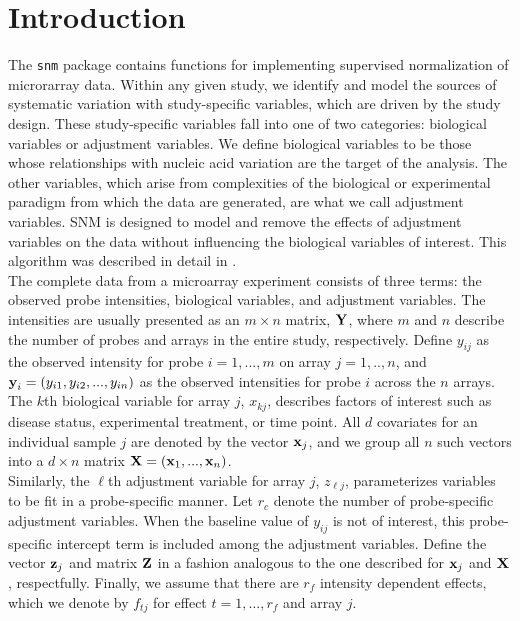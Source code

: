 \documentclass[11pt]{article}
\newcommand{\Rpackage}[1]{{\texttt{#1}}}
\newcommand{ \bm }[1]{ \mbox{\bf {#1}} }
\begin{document}
\section{Introduction}\label{intro}
The \Rpackage{snm} package contains functions for implementing
supervised normalization of microrarray data.  Within any given study,
we identify and model the sources of systematic variation with study-specific
variables, which are driven by the study design. These study-specific variables fall into one of two
categories: biological variables or adjustment variables. We define
biological variables to be those whose relationships with nucleic acid
variation are the target of the analysis. The other variables, which
arise from complexities of the biological or experimental paradigm
from which the data are generated, are what we call adjustment variables.  SNM is
designed to model and remove the effects of adjustment variables on the data
without influencing the biological variables of interest.  This
algorithm was described in detail in \cite{mecham2010}. \\

The complete data from a microarray experiment consists of three terms: the observed
probe intensities, biological variables, and adjustment variables. The intensities 
are usually presented as an $m \times n$ matrix, $\bm{Y}$, where $m$ and $n$ describe the 
number of probes and arrays in the entire study, respectively. Define $y_{ij}$ as the 
observed intensity for probe $i=1,...,m$ on array $j=1,..,n$, and $\bm{y}_i = (y_{i1}, y_{i2}, ..., y_{in})$ 
as the observed intensities for probe $i$ across the $n$ arrays. The $k$th biological variable for 
array $j$, $x_{kj}$, describes factors of interest such as disease status, experimental treatment, 
or time point. All $d$ covariates for an individual sample $j$ are denoted by the vector $\bm{x}_j$, 
and we group all $n$ such vectors into a $d \times n$ matrix $\bm{X} = (\bm{x}_1, ..., \bm{x}_n)$.  \\

Similarly, the $\ell$th adjustment variable for array $j$, $z_{\ell  j}$, parameterizes variables 
to be fit in a probe-specific manner.  Let $r_c$ denote the number of probe-specific adjustment 
variables.  When the baseline value of $y_{ij}$ is not of interest, this probe-specific 
intercept term is included among the adjustment variables.  Define the vector $\bm{z}_{j}$ and 
matrix $\bm{Z}$ in a fashion analogous to the one described for $\bm{x}_{j}$ and $\bm{X}$, respectfully.  
Finally, we assume that there are $r_f$ intensity dependent effects, which we denote by $f_{tj}$ for 
effect $t=1, \ldots, r_f$ and array $j$. \\
\end{document}
